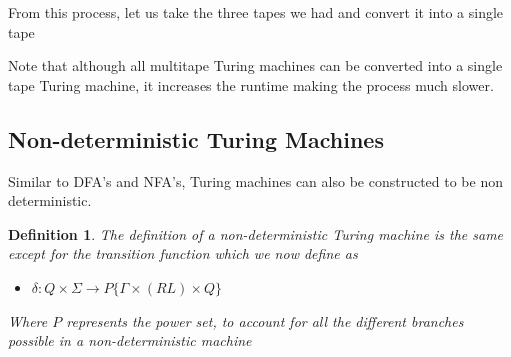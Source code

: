 \documentclass[12pt, letterpaper]{article}
\newtheorem*{defn}{Definition}
\begin{document}
From this process, let us take the three tapes we had and convert it into a single tape
\begin{center}
\end{center}
Note that although all multitape Turing machines can be converted into a single tape Turing machine, it increases the runtime making the process much slower.


\subsection{Non-deterministic Turing Machines}
Similar to DFA's and NFA's, Turing machines can also be constructed to be non deterministic.
\begin{defn}
The definition of a non-deterministic Turing machine is the same except for the transition function which we now define as 
\begin{itemize}
\item $\delta: Q \times \Sigma \rightarrow P \{ \Gamma \times (RL) \times Q \}$
\end{itemize}
Where $P$ represents the power set, to account for all the different branches possible in a non-deterministic machine
\end{defn} \cite{eric}
\end{document}
